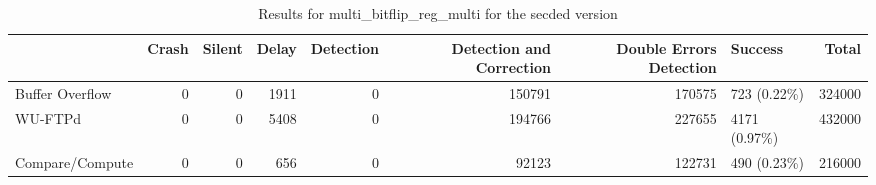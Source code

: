 \begin{table}[t]
	\centering
	\caption{Results for multi_bitflip_reg_multi for the secded version}
	\label{table:end_sim_by_status_secded_1_multi_bitflip_reg_multi}
	\begin{tabular}{lrrrrrrlr}
		\toprule
		                & Crash & Silent & Delay & Detection & Detection and Correction & Double Errors Detection & Success       & Total  \\
		\midrule
		Buffer Overflow & 0     & 0      & 1911  & 0         & 150791                   & 170575                  & 723 (0.22\%)  & 324000 \\
		WU-FTPd         & 0     & 0      & 5408  & 0         & 194766                   & 227655                  & 4171 (0.97\%) & 432000 \\
		Compare/Compute & 0     & 0      & 656   & 0         & 92123                    & 122731                  & 490 (0.23\%)  & 216000 \\
		\bottomrule
	\end{tabular}
\end{table}
